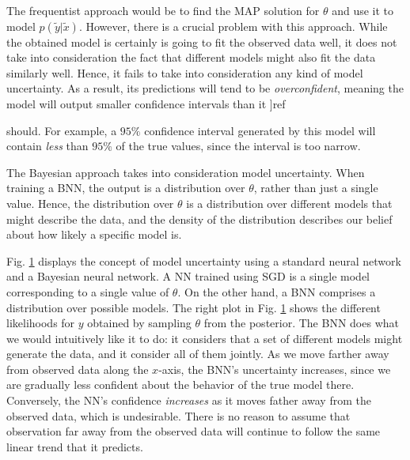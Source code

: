 \documentclass[12pt]{article}
\begin{document}
The frequentist approach would be to find the MAP solution for $\theta$ and use it to model $p(\tilde{y} | \tilde{x})$. However, there is a crucial problem with this approach. While the obtained model is certainly is going to fit the observed data well, it does not take into consideration the fact that different models might also fit the data similarly well. Hence, it fails to take into consideration any kind of model uncertainty. As a result, its predictions will tend to be \textit{overconfident}, meaning the model will output smaller confidence intervals than it ]ref{should. For example, a $95\%$ confidence interval generated by this model will contain \textit{less} than $95\%$ of the true values, since the interval is too narrow.

The Bayesian approach takes into consideration model uncertainty. When training a BNN, the output is a distribution over $\theta$, rather than just a single value. Hence, the distribution over $\theta$ is a distribution over different models that might describe the data, and the density of the distribution describes our belief about how likely a specific model is.

Fig. \ref{fig_1d_predictions_overlaid} displays the concept of model uncertainty using a standard neural network and a Bayesian neural network. A NN trained using SGD is a single model corresponding to a single value of $\theta$. On the other hand, a BNN comprises a distribution over possible models. The right plot in Fig. \ref{fig_1d_predictions_overlaid} shows the different likelihoods for $y$ obtained by sampling $\theta$ from the posterior. The BNN does what we would intuitively like it to do: it considers that a set of different models might generate the data, and it consider all of them jointly. As we move farther away from observed data along the $x$-axis, the BNN's uncertainty increases, since we are gradually less confident about the behavior of the true model there. Conversely, the NN's confidence \textit{increases} as it moves father away from the observed data, which is undesirable. There is no reason to assume that observation far away from the observed data will continue to follow the same linear trend that it predicts.

\begin{figure}[H]
\centering
{}
\caption{}
\label{fig_1d_predictions_overlaid}
\end{figure}

}
\end{document}
